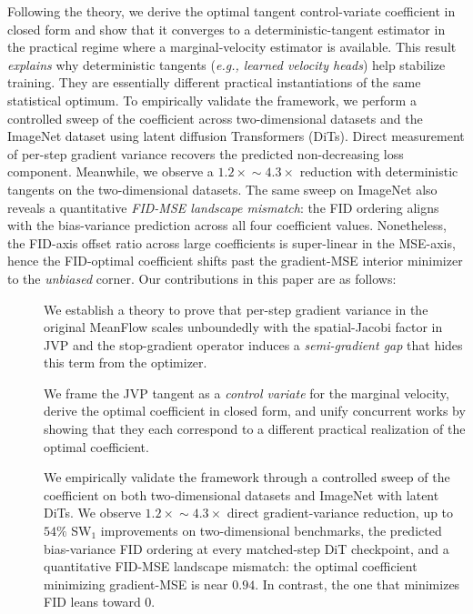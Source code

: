 Following the theory, we derive the optimal tangent control-variate coefficient in closed form and show that it converges to a deterministic-tangent estimator in the practical regime where a marginal-velocity estimator is available. This result \textit{explains} why deterministic tangents (\emph{e.g., learned velocity heads}) help stabilize training. They are essentially different practical instantiations of the same statistical optimum. To empirically validate the framework, we perform a controlled sweep of the coefficient across two-dimensional datasets and the ImageNet dataset using latent diffusion Transformers (DiTs). Direct measurement of per-step gradient variance recovers the predicted non-decreasing loss component. Meanwhile, we observe a $1.2\!\times\!\!\sim\!\!4.3\!\times$ reduction with deterministic tangents on the two-dimensional datasets. The same sweep on ImageNet also reveals a quantitative \emph{FID-MSE landscape mismatch}: the FID ordering aligns with the bias-variance prediction across all four coefficient values. Nonetheless, the FID-axis offset ratio across large coefficients is super-linear in the MSE-axis, hence the FID-optimal coefficient shifts past the gradient-MSE interior minimizer to the \emph{unbiased} corner. Our contributions in this paper are as follows:
\begin{description}
    \item[] We establish a theory to prove that per-step gradient variance in the original MeanFlow scales unboundedly with the spatial-Jacobi factor in JVP and the stop-gradient operator induces a \emph{semi-gradient gap} that hides this term from the optimizer.
    \item[] We frame the JVP tangent as a \emph{control variate} for the marginal velocity, derive the optimal coefficient in closed form, and unify concurrent works by showing that they each correspond to a different practical realization of the optimal coefficient.
    \item[] We empirically validate the framework through a controlled sweep of the coefficient on both two-dimensional datasets and ImageNet with latent DiTs. We observe $1.2\!\times\!\!\sim\!\!4.3\!\times$ direct gradient-variance reduction, up to $54\%$ SW$_{1}$ improvements on two-dimensional benchmarks, the predicted bias-variance FID ordering at every matched-step DiT checkpoint, and a quantitative FID-MSE landscape mismatch: the optimal coefficient minimizing gradient-MSE is near $0.94$. In contrast, the one that minimizes FID leans toward $0$.
\end{description}
